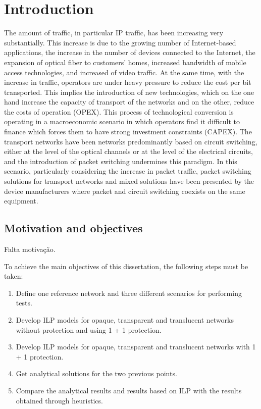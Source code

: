 \chapter{Introduction}
\label{introduction}

The amount of traffic, in particular IP traffic, has been increasing very substantially. This increase is due to the growing number of Internet-based applications, the increase in the number of devices connected to the Internet, the expansion of optical fiber to customers' homes, increased bandwidth of mobile access technologies, and increased of video traffic.
At the same time, with the increase in traffic, operators are under heavy pressure to reduce the cost per bit transported. This implies the introduction of new technologies, which on the one hand increase the capacity of transport of the networks and on the other, reduce the costs of operation (OPEX).
This process of technological conversion is operating in a macroeconomic scenario in which operators find it difficult to finance which forces them to have strong investment constraints (CAPEX).
The transport networks have been networks predominantly based on circuit switching, either at the level of the optical channels or at the level of the electrical circuits, and the introduction of packet switching undermines this paradigm.
In this scenario, particularly considering the increase in packet traffic, packet switching solutions for transport networks and mixed solutions have been presented by the device manufacturers where packet and circuit switching coexists on the same equipment.

\newpage
\section{Motivation and objectives}
\label{objectives}
Falta motivação.

To achieve the main objectives of this dissertation, the following steps must be taken:

\begin{enumerate}
  \item Define one reference network and three different scenarios for performing tests.
  \item Develop ILP models for opaque, transparent and translucent networks without protection and using 1 + 1 protection.
  \item Develop ILP models for opaque, transparent and translucent networks with 1 + 1 protection.
  \item Get analytical solutions for the two previous points.
  \item Compare the analytical results and results based on ILP with the results obtained through heuristics.
\end{enumerate}


